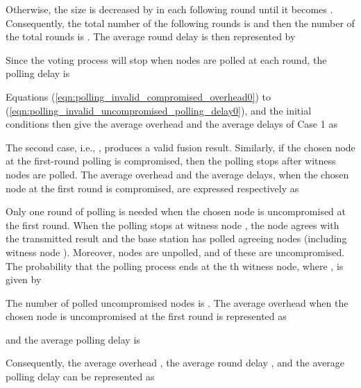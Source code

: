 \documentclass[12pt, onecolumn, draftcls]{IEEEtran}
\begin{document}
Otherwise, the size is decreased by  in each following round
until it becomes . Consequently, the total number of the
following rounds is  and then the number of
the total rounds is . The average round delay
is then represented by

Since the voting process will stop when  nodes are
polled at each round, the polling delay is


 Equations
(\ref{eqn:polling_invalid_compromised_overhead0}) to
(\ref{eqn:polling_invalid_uncompromised_polling_delay0}), and the
initial conditions then give the average overhead and the average
delays of Case 1 as


The second case, i.e., , produces a valid fusion result.
Similarly, if the chosen node at the first-round polling is
compromised, then the polling stops after  witness nodes are
polled. The average overhead and the average delays, when the chosen
node at the first round is compromised, are expressed respectively
as

Only one round of polling is needed when the chosen node is
uncompromised at the first round. When the polling stops at witness
node , the node agrees with the transmitted result and the base
station has polled  agreeing nodes (including witness node ).
Moreover,  nodes are unpolled, and  of these are
uncompromised. The probability that the polling process ends at the
th witness node, where , is given by

The number of polled uncompromised nodes is . The average
overhead when the chosen node is uncompromised at the first round is
represented as

and the average polling delay is

 Consequently, the average
overhead , the average round delay
, and the average polling delay 
can be represented as
\end{document}
